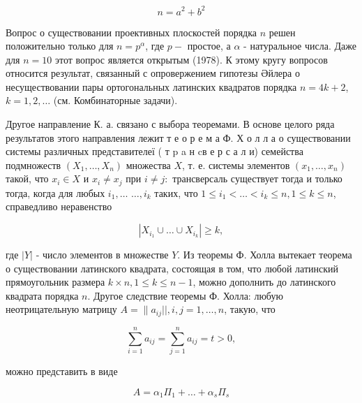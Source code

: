\documentclass[10pt]{article}
\begin{document}
\[

n=a^{2}+b^{2}

\]



Вопрос о существовании проективных плоскостей порядка $n$ решен положительно только для $n=p^{\alpha}$, где $p-$ простое, а $\alpha$ - натуральное числа. Даже для $n=10$ этот вопрос является открытым (1978). К этому кругу вопросов относится результат, связанный с опровержением гипотезы Әйлера о несуществовании пары ортогональных латинских квадратов порядка $n=4 k+2$, $k=1,2, \ldots$ (см. Комбинаторные задачи).



Другое направление К. а. связано с выбора теоремами. В основе целого ряда результатов этого направления лежит т е о р е м а Ф. Х о л л а о существовании системы различных представителеї ( т p a н cв е р с а л и) семейства подмножеств $\left(X_{1}, \ldots, X_{n}\right)$ множества $X$, т. е. системы элементов $\left(x_{1}, \ldots, x_{n}\right)$ такой, что $x_{i} \in X$ и $x_{i} \neq x_{j}$ при $i \neq j:$ трансверсаль существует тогда и только тогда, когда для любых $i_{1}, \ldots$ $\ldots, i_{k}$ таких, что $1 \leqslant i_{1}<\ldots<i_{k} \leqslant n, 1 \leqslant k \leqslant n$, справедливо неравенство



\[

\left|X_{i_{1}} \cup \ldots \cup X_{i_{k}}\right| \geqslant k,

\]



где $|Y|$ - число элементов в множестве $Y$. Из теоремы Ф. Холла вытекает теорема о существовании латинского квадрата, состоящая в том, что любой латинский прямоугольник размера $k \times n, 1 \leqslant k \leqslant n-1$, можно дополнить до латинского квадрата порядка $n$. Другое следствие теоремы Ф. Холла: любую неотрицательную матрицу $A=\| a_{i j}||, i, j=1, \ldots, n$, такую, что



\[

\sum_{i=1}^{n} a_{i j}=\sum_{j=1}^{n} a_{i j}=t>0,

\]



можно представить в виде



\[

A=\alpha_{1} \Pi_{1}+\ldots+\alpha_{s} \Pi_{s}

\]
\end{document}
